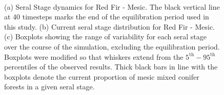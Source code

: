 \begin{figure}[!htbp]
  \centering
  \\
  \caption{(a) Seral Stage dynamics for Red Fir - Mesic. The black vertical line at 40 timesteps marks the end of the equilibration period used in this study. (b) Current seral stage distribution for Red Fir - Mesic. (c) Boxplots showing the range of variability for each seral stage over the course of the simulation, excluding the equilibration period. Boxplots were modified so that whiskers extend from the $5^{\text{th}} - 95^{\text{th}}$ percentiles of the observed results. Thick black bars in line with the boxplots denote the current proportion of mesic mixed conifer forests in a given seral stage.} 
  \label{fig:covcond_rfrm}
\end{figure}

